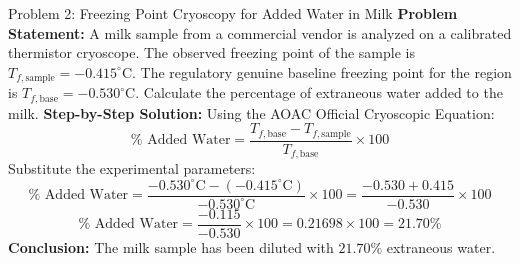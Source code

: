 \documentclass[11pt,a4paper,oneside]{article}
\begin{document}
\begin{examplebox}{Problem 2: Freezing Point Cryoscopy for Added Water in Milk}
\textbf{Problem Statement:}
A milk sample from a commercial vendor is analyzed on a calibrated thermistor cryoscope. The observed freezing point of the sample is $T_{f,\text{sample}} = -0.415^\circ\text{C}$. The regulatory genuine baseline freezing point for the region is $T_{f,\text{base}} = -0.530^\circ\text{C}$. Calculate the percentage of extraneous water added to the milk.
\vspace{0.2cm}
\textbf{Step-by-Step Solution:}
Using the AOAC Official Cryoscopic Equation:
$$\% \text{ Added Water} = \frac{T_{f,\text{base}} - T_{f,\text{sample}}}{T_{f,\text{base}}} \times 100$$
Substitute the experimental parameters:
$$\% \text{ Added Water} = \frac{-0.530^\circ\text{C} - (-0.415^\circ\text{C})}{-0.530^\circ\text{C}} \times 100 = \frac{-0.530 + 0.415}{-0.530} \times 100$$
$$\% \text{ Added Water} = \frac{-0.115}{-0.530} \times 100 = 0.21698 \times 100 = \mathbf{21.70\%}$$
\textbf{Conclusion:} The milk sample has been diluted with $\mathbf{21.70\%}$ extraneous water.
\end{examplebox}
\end{document}
